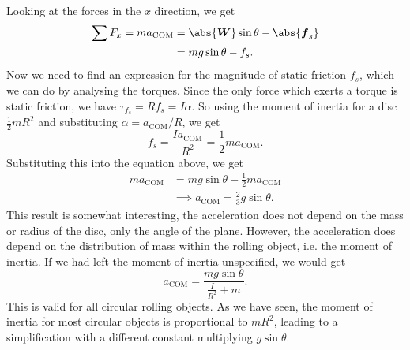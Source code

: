 \documentclass[../classical_mechanics.tex]{subfiles}
\begin{document}
\begin{example}
            \paragraph{}
            Looking at the forces in the $x$ direction, we get
            \begin{align}
                \sum F_x=m a_\text{COM}&=\abs{\vec{W}}\sin\theta-\abs{\vec{f}_s}\\
                &=mg\sin\theta-f_s.
            \end{align}
            Now we need to find an expression for the magnitude of static friction $f_s$, which we can do by analysing the torques.
            Since the only force which exerts a torque is static friction, we have $\tau_{f_s}=Rf_s=I\alpha$.
            So using the moment of inertia for a disc $\frac{1}{2}mR^2$ and substituting $\alpha=a_\text{COM}/R$, we get
            \begin{equation}
                f_s=\frac{I a_\text{COM}}{R^2}=\frac{1}{2}ma_\text{COM}.
            \end{equation}
            Substituting this into the equation above, we get
            \begin{align}
                ma_\text{COM}&=mg\sin\theta-\frac{1}{2}ma_\text{COM}\\
                &\implies a_\text{COM}=\frac{2}{3}g\sin\theta.
            \end{align}
            This result is somewhat interesting, the acceleration does not depend on the mass or radius of the disc, only the angle of the plane.
            However, the acceleration does depend on the distribution of mass within the rolling object, i.e. the moment of inertia.
            If we had left the moment of inertia unspecified, we would get
            \begin{equation}
                a_\text{COM}=\frac{mg\sin\theta}{\frac{I}{R^2}+m}.
            \end{equation}
            This is valid for all circular rolling objects.
            As we have seen, the moment of inertia for most circular objects is proportional to $mR^2$, leading to a simplification with a different constant multiplying $g\sin\theta$.
        \end{example}
\end{document}
